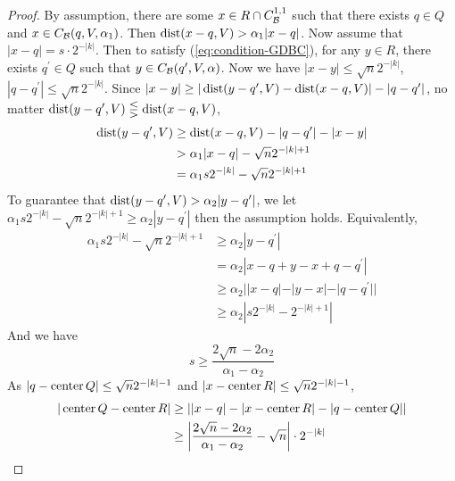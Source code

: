 \begin{proof} 
    By assumption, there are some $x\in R\cap C_\mathcal B^{1, 1}$ such that there exists $q\in Q$ and $x\in C_\mathcal B(q, V, \alpha_1)$. Then $\operatorname{dist}(x-q, V) > \alpha_1|x-q|$. Now assume that $|x-q| = s\cdot 2^{-|k|}$. Then to satisfy (\ref{eq:condition-GDBC}), for any $y\in R$, there exists $q^\prime\in Q$ such that $y\in C_\mathcal B(q^\prime, V, \alpha)$. Now we have $|x-y|\leq \sqrt{n}2^{-|k|}$, $|q-q^\prime|\leq \sqrt{n}2^{-|k|}$. Since $ |x-y| \geq|\operatorname{dist} (y-q^\prime, V)-\operatorname{dist}(x-q, V)| - |q-q^\prime|$, no matter $\operatorname{dist} (y-q^\prime, V)\lesseqgtr\operatorname{dist}(x-q, V)$,
    \begin{equation*}
        \begin{split}
            \operatorname{dist}(y-q^\prime, V) &\geq \operatorname{dist}(x-q, V)-|q-q^\prime|-|x-y| \\
            &> \alpha_1|x-q| - \sqrt{n}2^{-|k|+1}\\
            &= \alpha_1 s 2^{-|k|} - \sqrt{n}2^{-|k|+1}
        \end{split}
    \end{equation*}
    To guarantee that $\operatorname{dist}(y-q^\prime, V) > \alpha_2|y-q^\prime|$, we let $\alpha_1 s 2^{-|k|} - \sqrt{n}2^{-|k|+1} \geq  \alpha_2|y-q^\prime|$ then the assumption holds. Equivalently,
    \begin{equation*}
        \begin{split}
            \alpha_1 s 2^{-|k|} - \sqrt{n}2^{-|k|+1} &\geq  \alpha_2|y-q^\prime| \\
            &= \alpha_2 |x-q+y-x+q-q^\prime| \\
            &\geq \alpha_2||x-q|-|y-x|-|q-q^\prime||\\
            &\geq \alpha_2|s2^{-|k|}-2^{-|k|+1}|
        \end{split}
    \end{equation*}
    And we have 
    $$s\geq \frac{2\sqrt{n} - 2\alpha_2}{\alpha_1-\alpha_2}$$
    As $|q-\operatorname{center} Q|\leq \sqrt{n}2^{-|k|-1}$ and $|x-\operatorname{center} R| \leq \sqrt{n}2^{-|k|-1}$,
    \begin{equation*}
        \begin{split}
            |\operatorname{center} Q-\operatorname{center} R| &\geq ||x-q|-|x-\operatorname{center} R|-|q-\operatorname{center} Q|| \\
            &\geq\left|\frac{2\sqrt{n} - 2\alpha_2}{\alpha_1-\alpha_2}-\sqrt{n}\right|\cdot 2^{-|k|}
        \end{split}
    \end{equation*}
\end{proof}
